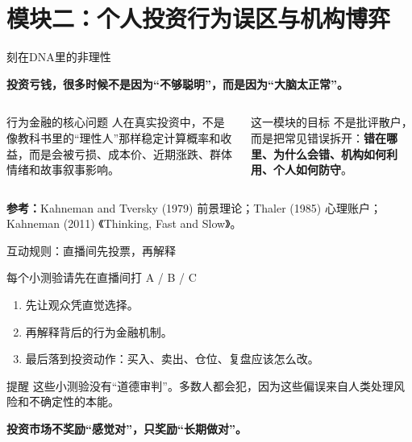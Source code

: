 \documentclass[UTF8,aspectratio=169,11pt]{ctexbeamer}
\newcommand{\source}[1]{\vfill{\scriptsize\color{aqgray}\textbf{参考：}#1}}
\begin{document}
\section{模块二：个人投资行为误区与机构博弈}

\begin{frame}{刻在DNA里的非理性}
\begin{center}
\Large \textbf{投资亏钱，很多时候不是因为“不够聪明”，而是因为“大脑太正常”。}
\end{center}
\vspace{0.25cm}
\begin{columns}[T,totalwidth=\textwidth]
\begin{casebox}{行为金融的核心问题}
\small
人在真实投资中，不是像教科书里的“理性人”那样稳定计算概率和收益，而是会被亏损、成本价、近期涨跌、群体情绪和故事叙事影响。
\end{casebox}
\begin{keybox}{这一模块的目标}
\small
不是批评散户，而是把常见错误拆开：\textbf{错在哪里、为什么会错、机构如何利用、个人如何防守}。
\end{keybox}
\end{columns}
\source{Kahneman and Tversky (1979) 前景理论；Thaler (1985) 心理账户；Kahneman (2011) 《Thinking, Fast and Slow》。}
\end{frame}

\begin{frame}{互动规则：直播间先投票，再解释}
\begin{keybox}{每个小测验请先在直播间打 A / B / C}
\small
\begin{enumerate}
\item 先让观众凭直觉选择。
\item 再解释背后的行为金融机制。
\item 最后落到投资动作：买入、卖出、仓位、复盘应该怎么改。
\end{enumerate}
\end{keybox}
\vspace{0.25cm}
\begin{riskbox}{提醒}
这些小测验没有“道德审判”。多数人都会犯，因为这些偏误来自人类处理风险和不确定性的本能。
\end{riskbox}
\vspace{0.25cm}
\begin{center}\Large \textbf{投资市场不奖励“感觉对”，只奖励“长期做对”。}\end{center}
\end{frame}
\end{document}

